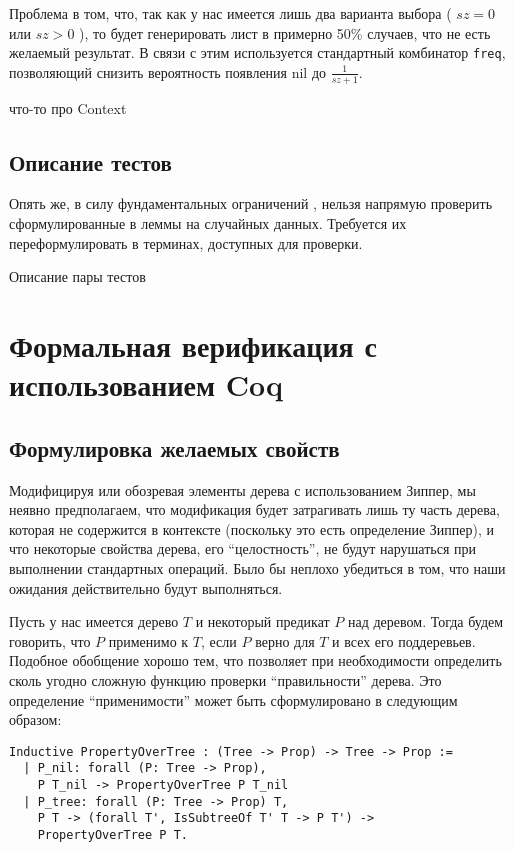 Проблема в том, что, так как у нас имеется лишь два варианта выбора ( $sz = 0$ или $sz > 0$ ), то \tqc будет генерировать лист в примерно 50\% случаев, что не есть желаемый результат. В связи с этим используется стандартный комбинатор \texttt{freq}, позволяющий снизить вероятность появления nil до $\frac{1}{sz + 1}$.

что-то про Context

\subsection{Описание тестов}

Опять же, в силу фундаментальных ограничений \tqc, нельзя напрямую проверить сформулированные в \tcoq леммы на случайных данных. Требуется их переформулировать в терминах, доступных для проверки.

Описание пары тестов

\section{Формальная верификация с использованием Coq}

\subsection{Формулировка желаемых свойств}

Модифицируя или обозревая элементы дерева с использованием Зиппер, мы неявно предполагаем, что модификация будет затрагивать лишь ту часть дерева, которая не содержится в контексте (поскольку это есть определение Зиппер), и что некоторые свойства дерева, его ``целостность'', не будут нарушаться при выполнении стандартных операций. Было бы неплохо убедиться в том, что наши ожидания действительно будут выполняться.

Пусть у нас имеется дерево $T$ и некоторый предикат $P$ над деревом. Тогда будем говорить, что $P$ применимо к $T$, если $P$ верно для $T$ и всех его поддеревьев. Подобное обобщение хорошо тем, что позволяет при необходимости определить сколь угодно сложную функцию проверки ``правильности'' дерева. Это определение ``применимости'' может быть сформулировано в \tcoq следующим образом:

\begin{lstlisting}
Inductive PropertyOverTree : (Tree -> Prop) -> Tree -> Prop :=
  | P_nil: forall (P: Tree -> Prop),
    P T_nil -> PropertyOverTree P T_nil
  | P_tree: forall (P: Tree -> Prop) T,
    P T -> (forall T', IsSubtreeOf T' T -> P T') ->
    PropertyOverTree P T.
\end{lstlisting}

